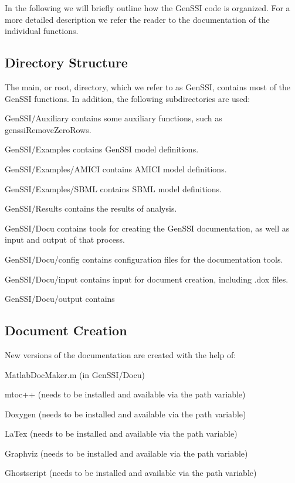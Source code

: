 In the following we will briefly outline how the Gen\+S\+SI code is organized. For a more detailed description we refer the reader to the documentation of the individual functions.\hypertarget{code_directory}{}\subsection{Directory Structure}\label{code_directory}
The main, or root, directory, which we refer to as Gen\+S\+SI, contains most of the Gen\+S\+SI functions. In addition, the following subdirectories are used\+:


\begin{DoxyItemize}
\item Gen\+S\+S\+I/\+Auxiliary contains some auxiliary functions, such as genssi\+Remove\+Zero\+Rows.
\item Gen\+S\+S\+I/\+Examples contains Gen\+S\+SI model definitions.
\item Gen\+S\+S\+I/\+Examples/\+A\+M\+I\+CI contains A\+M\+I\+CI model definitions.
\item Gen\+S\+S\+I/\+Examples/\+S\+B\+ML contains S\+B\+ML model definitions.
\item Gen\+S\+S\+I/\+Results contains the results of analysis.
\item Gen\+S\+S\+I/\+Docu contains tools for creating the Gen\+S\+SI documentation, as well as input and output of that process.
\item Gen\+S\+S\+I/\+Docu/config contains configuration files for the documentation tools.
\item Gen\+S\+S\+I/\+Docu/input contains input for document creation, including .dox files.
\item Gen\+S\+S\+I/\+Docu/output contains
\end{DoxyItemize}\hypertarget{code_document}{}\subsection{Document Creation}\label{code_document}
New versions of the documentation are created with the help of\+:


\begin{DoxyItemize}
\item Matlab\+Doc\+Maker.\+m (in Gen\+S\+S\+I/\+Docu)
\item mtoc++ (needs to be installed and available via the path variable)
\item Doxygen (needs to be installed and available via the path variable)
\item La\+Tex (needs to be installed and available via the path variable)
\item Graphviz (needs to be installed and available via the path variable)
\item Ghostscript (needs to be installed and available via the path variable)
\end{DoxyItemize}

